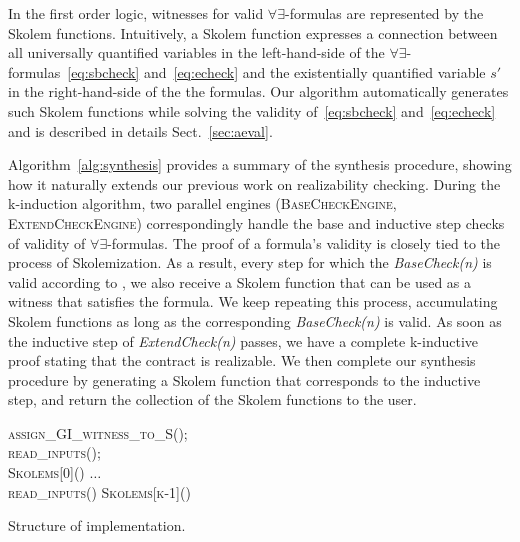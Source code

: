In the first order logic, witnesses for valid $\forall\exists$-formulas are represented by the Skolem functions.
Intuitively, a Skolem function expresses a connection between all universally quantified variables in the left-hand-side of the $\forall\exists$-formulas~\eqref{eq:sbcheck} and~\eqref{eq:echeck} and the existentially quantified variable $s'$ in the right-hand-side of the the formulas.
Our algorithm automatically generates such Skolem functions
while solving the validity of~\eqref{eq:sbcheck} and~\eqref{eq:echeck} and is described in details Sect.~\ref{sec:aeval}.

\synthesisalgorithm

Algorithm~\ref{alg:synthesis} provides a summary of the synthesis procedure,
showing how it naturally extends our previous work on realizability checking.
During the k-induction algorithm, two parallel engines (\textsc{BaseCheckEngine,
ExtendCheckEngine}) correspondingly handle the base and inductive step checks of
validity of $\forall\exists$-formulas. The proof of a formula's validity is
closely tied to the process of Skolemization. As a result, every step for which
the \textit{BaseCheck(n)} is valid according to \aeval, we also receive a Skolem function
that can be used as a witness that satisfies the formula. We keep repeating this
process, accumulating Skolem functions as long as the corresponding \textit{BaseCheck(n)}
is valid. As soon as the inductive step of \textit{ExtendCheck(n)} passes, we
have a complete k-inductive proof stating that the contract is realizable. We then complete our synthesis
procedure by generating a Skolem function that corresponds to the inductive
step, and return the collection of the Skolem functions to the user.


\begin{algorithm2e}[tb]
\SetAlgoSkip{}
\BlankLine
  \textsc{assign\_GI\_witness\_to\_S()}; 	\\

\BlankLine
  \textsc{read\_inputs()}; 		\\
  \textsc{Skolems[0]()}\;
  $\ldots$\\
  \textsc{read\_inputs()}\;
  \textsc{Skolems[k-1]()}\;
  
\BlankLine  


\caption{Structure of implementation.}
\label{alg:synt}
\end{algorithm2e}

